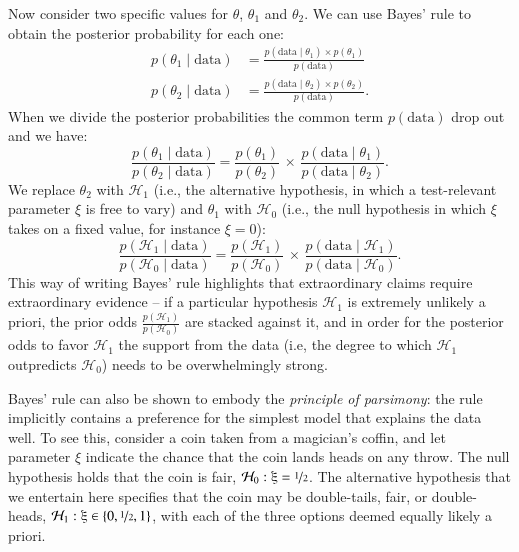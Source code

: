 \documentclass[man]{apa7}
\begin{document}
Now consider two specific values for $\theta$, $\theta_1$ and $\theta_2$. We can use Bayes' rule to obtain the posterior probability for each one:
\begin{align}
p(\theta_1 \mid \text{data})& =  \frac{p(\text{data} \mid \theta_1) \times p(\theta_1)}{p(\text{data})}\\
p(\theta_2 \mid \text{data})& =  \frac{p(\text{data} \mid \theta_2) \times p(\theta_2)}{p(\text{data})}.
\end{align}
When we divide the posterior probabilities the common term $p(\text{data})$ drop out and we have:
\begin{equation}
    \frac{p(\theta_1 \mid \text{data})}{p(\theta_2 \mid \text{data})} = \frac{p(\theta_1)}{p(\theta_2)} \, \times \, \frac{p(\text{data} \mid \theta_1)}{p(\text{data} \mid \theta_2)}.
\end{equation}
We replace $\theta_2$ with $\mathcal{H}_1$ (i.e., the alternative hypothesis, in which a test-relevant parameter $\xi$ is free to vary) and $\theta_1$ with $\mathcal{H}_0$ (i.e., the null hypothesis in which $\xi$ takes on a fixed value, for instance $\xi=0$):
\begin{equation}
    \frac{p(\mathcal{H}_1 \mid \text{data})}{p(\mathcal{H}_0 \mid \text{data})} = \frac{p(\mathcal{H}_1)}{p(\mathcal{H}_0)} \, \times \, \frac{p(\text{data} \mid \mathcal{H}_1)}{p(\text{data} \mid \mathcal{H}_0)}.
\end{equation}
This way of writing Bayes' rule highlights that extraordinary claims require extraordinary evidence -- if a particular hypothesis $\mathcal{H}_1$ is extremely unlikely a priori, the prior odds $\frac{p(\mathcal{H}_1)}{p(\mathcal{H}_0)}$ are stacked against it, and in order for the posterior odds to favor $\mathcal{H}_1$ the support from the data (i.e, the degree to which $\mathcal{H}_1$ outpredicts $\mathcal{H}_0$) needs to be overwhelmingly strong.   

Bayes' rule can also be shown to embody the \emph{principle of parsimony}: the rule implicitly contains a preference for the simplest model that explains the data well. To see this, consider a coin taken from a magician's coffin, and let parameter $\xi$ indicate the chance that the coin lands heads on any throw. The null hypothesis holds that the coin is fair, $\mathcal{H}_0: \xi = \nicefrac{1}{2}$. The alternative hypothesis that we entertain here specifies that the coin may be double-tails, fair, or double-heads, $\mathcal{H}_1: \xi \in \{0, \nicefrac{1}{2}, 1\}$, with each of the three options deemed equally likely a priori. 
\end{document}
